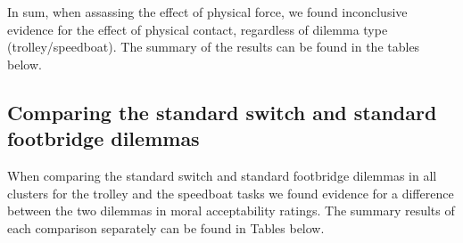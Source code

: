 \documentclass[
]{article}
\begin{document}
In sum, when assassing the effect of physical force, we found
inconclusive evidence for the effect of physical contact, regardless of
dilemma type (trolley/speedboat). The summary of the results can be
found in the tables below.

\begin{table}[H]

\caption{\label{tab:physical contact }Table S2. The effect of phyisical contact on moral dilemma judgements on Trolley dilemmas}
\end{table}

\hypertarget{comparing-the-standard-switch-and-standard-footbridge-dilemmas}{%
\subsection{Comparing the standard switch and standard footbridge
dilemmas}\label{comparing-the-standard-switch-and-standard-footbridge-dilemmas}}

When comparing the standard switch and standard footbridge dilemmas in
all clusters for the trolley and the speedboat tasks we found evidence
for a difference between the two dilemmas in moral acceptability
ratings. The summary results of each comparison separately can be found
in Tables below.
\end{document}
